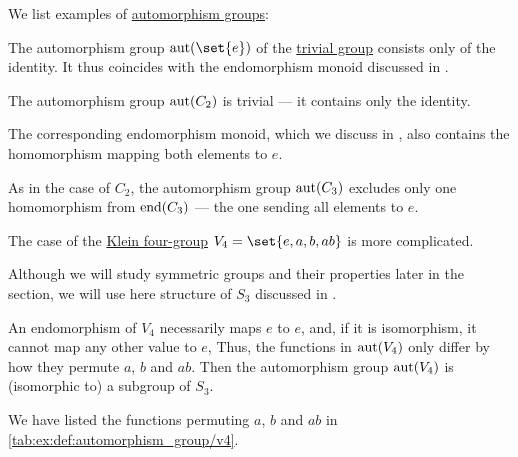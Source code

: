 \begin{example}\label{ex:def:automorphism_group}
  We list examples of \hyperref[def:automorphism_group]{automorphism groups}:
  \begin{thmenum}
     The automorphism group \( \aut(\set{ e }) \) of the \hyperref[def:group/trivial]{trivial group} consists only of the identity. It thus coincides with the endomorphism monoid discussed in .

     The automorphism group \( \operatorname{aut}(C_2) \) is trivial --- it contains only the identity.

    The corresponding endomorphism monoid, which we discuss in , also contains the homomorphism mapping both elements to \( e \).

     As in the case of \( C_2 \), the automorphism group \( \operatorname{aut}(C_3) \) excludes only one homomorphism from \( \operatorname{end}(C_3) \) --- the one sending all elements to \( e \).

     The case of the \hyperref[def:klein_four_group]{Klein four-group} \( V_4 = \set{ e, a, b, ab } \) is more complicated.

    Although we will study symmetric groups and their properties later in the section, we will use here structure of \( S_3 \) discussed in .

    An endomorphism of \( V_4 \) necessarily maps \( e \) to \( e \), and, if it is isomorphism, it cannot map any other value to \( e \), Thus, the functions in \( \operatorname{aut}(V_4) \) only differ by how they permute \( a \), \( b \) and \( ab \). Then the automorphism group \( \operatorname{aut}(V_4) \) is (isomorphic to) a subgroup of \( S_3 \).

    We have listed the functions permuting \( a \), \( b \) and \( ab \) in \cref{tab:ex:def:automorphism_group/v4}.


\end{thmenum}
\end{example}
